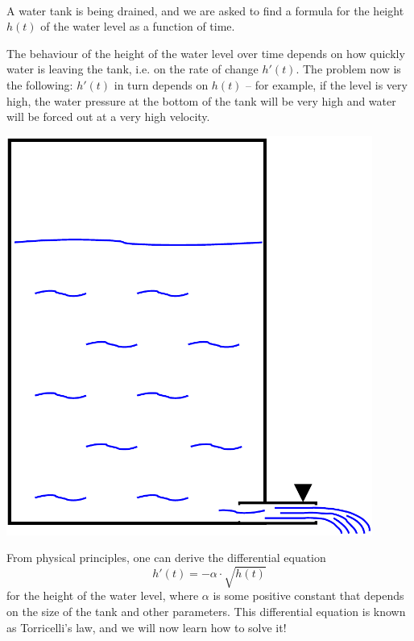 \begin{application}
~\\
\begin{minipage}{0.6\textwidth}
A water tank is being drained, and we are asked to find a formula for the height $h(t)$ of the water level as a function of time.

The behaviour of the height of the water level over time depends on how quickly water is leaving the tank, i.e. on the rate of change $h'(t)$. The problem now is the following: $h'(t)$ in turn depends on $h(t)$ -- for example, if the level is very high, the water pressure at the bottom of the tank will be very high and water will be forced out at a very high velocity.
\end{minipage} \hfill
\begin{minipage}{0.3\textwidth}
	\includegraphics[width=0.9\textwidth]{./Figures/water_tank.pdf}
\end{minipage}

\medskip
From physical principles, one can derive the differential equation
\[ h'(t) = -\alpha \cdot \sqrt{h(t)} \]
for the height of the water level, where $\alpha$ is some positive constant that depends on the size of the tank and other parameters. This differential equation is known as Torricelli's law, and we will now learn how to solve it!
\end{application}


